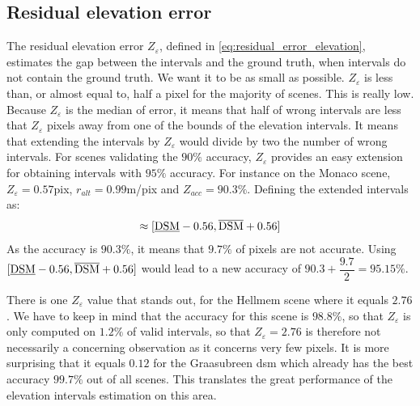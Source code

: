 \subsection{Residual elevation error}
The residual elevation error $Z_\varepsilon$, defined in \cref{eq:residual_error_elevation}, estimates the gap between the intervals and the ground truth, when intervals do not contain the ground truth. We want it to be as small as possible. $Z_\varepsilon$ is less than, or almost equal to, half a pixel for the majority of scenes. This is really low. Because $Z_\varepsilon$ is the median of error, it means that half of wrong intervals are less that $Z_\varepsilon$ pixels away from one of the bounds of the elevation intervals. It means that extending the intervals by $Z_\varepsilon$ would divide by two the number of wrong intervals. For scenes validating the $90\%$ accuracy, $Z_\varepsilon$ provides an easy extension for obtaining intervals with $95\%$ accuracy. For instance on the Monaco scene, $Z_\varepsilon=0.57$pix, $r_{alt}=0.99$m/pix and $Z_{acc}=90.3\%$. Defining the extended intervals as:
\begin{align*}
    [\underline{\DSM}-Z_\varepsilon\cdot r_{alt}, \overline{\DSM}+Z_\varepsilon\cdot r_{alt}] \approx [\underline{\DSM}-0.56, \overline{\DSM}+0.56]
\end{align*}
As the accuracy is $90.3\%$, it means that $9.7\%$ of pixels are not accurate. Using $[\underline{\mathrm{DSM}}-0.56, \overline{\mathrm{DSM}}+0.56]$ would lead to a new accuracy of $90.3+\dfrac{9.7}{2}=95.15\%$. 

There is one $Z_\varepsilon$ value that stands out, for the Hellmem scene where it equals $2.76$. We have to keep in mind that the accuracy for this scene is $98.8\%$, so that $Z_\varepsilon$ is only computed on $1.2\%$ of valid intervals, so that $Z_\varepsilon=2.76$ is therefore not necessarily a concerning observation as it concerns very few pixels. It is more surprising that it equals $0.12$ for the Graasubreen \acrshort{dsm} which already has the best accuracy $99.7\%$ out of all scenes. This translates the great performance of the elevation intervals estimation on this area.

